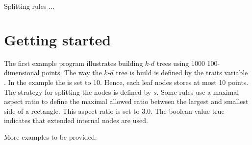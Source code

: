 Splitting rules ...

\section{Getting started}

The first example program illustrates building $k$-$d$ trees using 1000
100-dimensional points. 
The way the $k$-$d$ tree is build is defined by the traits variable .
In the example the  is set to 10.
Hence, each leaf nodes stores at most 10 points. 
The strategy for splitting the nodes is defined by $s$.
Some rules use a maximal aspect ratio to define
the maximal allowed ratio between the largest and smallest side of a rectangle.
This aspect ratio is set to 3.0. The boolean value true indicates that
extended internal nodes are used.


More examples to be provided.
